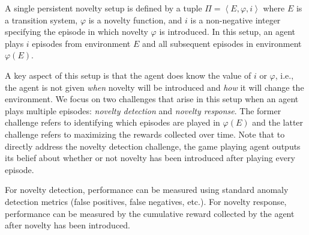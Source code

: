 \documentclass[sigconf]{aamas}
\newcommand{\tuple}[1]{\ensuremath{\left \langle #1 \right \rangle }}
\begin{document}
\begin{definition}
A single persistent novelty setup is defined by a tuple $\Pi=\tuple{E, \varphi, i}$ 
where $E$ is a transition system, $\varphi$ is a novelty function, 
and $i$ is a non-negative integer specifying the episode in which novelty $\varphi$ is introduced. 
In this setup, an agent plays $i$ episodes from environment $E$ 
and all subsequent episodes in environment $\varphi(E)$. 
\end{definition}

A key aspect of this setup is that the agent does know the value of $i$ or $\varphi$, i.e., the agent is not given \emph{when} novelty will be introduced and \emph{how} it will change the environment. 
We focus on two challenges that arise in this setup when an agent plays multiple episodes: \emph{novelty detection} and \emph{novelty response}. 
The former challenge refers to identifying which episodes are played in $\varphi(E)$ 
and the latter challenge refers to maximizing the rewards collected over time. 
Note that to directly address the novelty detection challenge, the game playing agent outputs its belief about whether or not novelty has been introduced after playing every episode. 








For novelty detection, performance can be measured using standard anomaly detection metrics (false positives, false negatives, etc.). 
For novelty response, performance can be measured by the cumulative reward collected by the agent after novelty has been introduced. %
\end{document}
